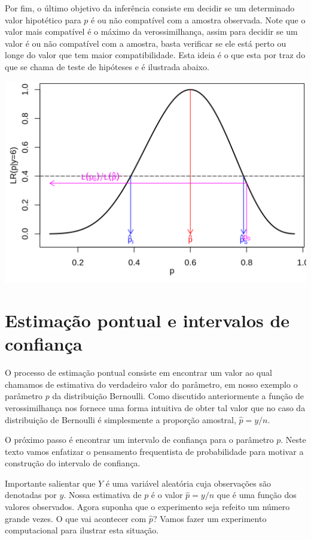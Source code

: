 \documentclass[10pt,a4paper]{book}
\begin{document}
Por fim, o último objetivo da inferência consiste em decidir se um
determinado valor hipotético para \(p\) é ou não compatível com a
amostra observada. Note que o valor mais compatível é o máximo da
verossimilhança, assim para decidir se um valor é ou não compatível com
a amostra, basta verificar se ele está perto ou longe do valor que tem
maior compatibilidade. Esta ideia é o que esta por traz do que se chama
de teste de hipóteses e é ilustrada abaixo.

\begin{center}\includegraphics{figures/unnamed-chunk-378-1} \end{center}

\section{Estimação pontual e intervalos de
confiança}\label{estimauxe7uxe3o-pontual-e-intervalos-de-confianuxe7a}

O processo de estimação pontual consiste em encontrar um valor ao qual
chamamos de estimativa do verdadeiro valor do parâmetro, em nosso
exemplo o parâmetro \(p\) da distribuição Bernoulli. Como discutido
anteriormente a função de verossimilhança nos fornece uma forma
intuitiva de obter tal valor que no caso da distribuição de Bernoulli é
simplesmente a proporção amostral, \(\hat{p} = y/n\).

O próximo passo é encontrar um intervalo de confiança para o parâmetro
\(p\). Neste texto vamos enfatizar o pensamento frequentista de
probabilidade para motivar a construção do intervalo de confiança.

Importante salientar que \(Y\) é uma variável aleatória cuja observações
são denotadas por \(y\). Nossa estimativa de \(p\) é o valor
\(\hat{p} = y/n\) que é uma função dos valores observados. Agora suponha
que o experimento seja refeito um número grande vezes. O que vai
acontecer com \(\hat{p}\)? Vamos fazer um experimento computacional para
ilustrar esta situação.
\end{document}
